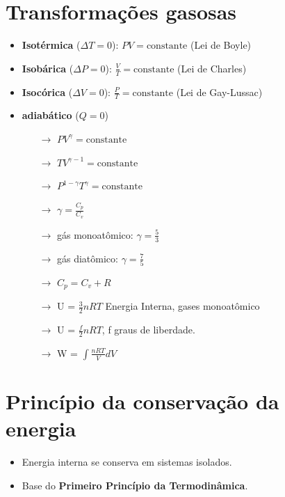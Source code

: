 \documentclass[a4paper,12pt]{article}
\begin{document}
\begin{multicols}{2}
\section{Transformações gasosas}
\begin{itemize}
    \item \textbf{Isotérmica} ($\Delta T = 0$): $PV = \text{constante}$ \hfill (Lei de Boyle)
    \item \textbf{Isobárica} ($\Delta P = 0$): $\frac{V}{T} = \text{constante}$ \hfill (Lei de Charles)
    \item \textbf{Isocórica} ($\Delta V = 0$): $\frac{P}{T} = \text{constante}$ \hfill (Lei de Gay-Lussac)
    \item \textbf{adiabático} ($Q = 0$) \hfill
    \begin{itemize}
        \item[$\rightarrow$] $PV^{\gamma} = \text{constante}$
        \item[$\rightarrow$] $TV^{\gamma -1} = \text{constante}$
        \item[$\rightarrow$] $P^{1-\gamma}T^{\gamma} = \text{constante}$
        \item[$\rightarrow$] $\gamma = \frac{C_{p}}{C_{v}}$
        \item[$\rightarrow$] g\'as monoat\^omico: $\gamma = \frac{5}{3}$
        \item[$\rightarrow$] g\'as diat\^omico: $\gamma = \frac{7}{5}$
        \item[$\rightarrow$] $C_{p} = C_{v} + R$
        \item[$\rightarrow$] U = $\frac{3}{2}nRT$ Energia Interna, gases monoat\^omico
        \item[$\rightarrow$] U = $\frac{f}{2}nRT$, f graus de liberdade.
        \item[$\rightarrow$] W = $\int \frac{nRT}{V}dV$
    \end{itemize}
\end{itemize}

\section{Princípio da conservação da energia}
\begin{itemize}
    \item Energia interna se conserva em sistemas isolados.
    \item Base do \textbf{Primeiro Princípio da Termodinâmica}.
\end{itemize}


\end{multicols}
\end{document}
